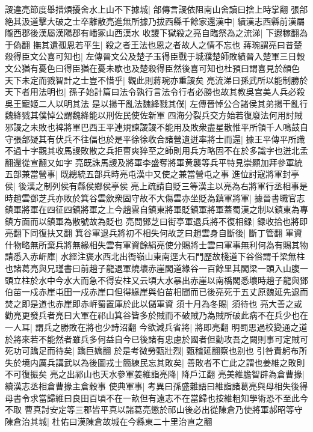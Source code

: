 謖違亮節度舉措煩擾舍水上山不下據城|{
	郃傳言謖依阻南山舍讀曰捨上時掌翻}
張郃絶其汲道擊大破之士卒離散亮進無所據乃拔西縣千餘家還漢中|{
	續漢志西縣前漢屬隴西郡後漢屬漢陽郡有嶓冢山西漢水}
收謖下獄殺之亮自臨祭為之流涕|{
	下遐稼翻為于偽翻}
撫其遺孤恩若平生|{
	殺之者王法也恩之者故人之情不忘也}
蔣琬謂亮曰昔楚殺得臣文公喜可知也|{
	左傳晉文公及楚子玉得臣戰于城濮楚師敗績晉入楚軍三日穀文公猶有憂色曰得臣猶在憂未歇也及楚殺得臣然後喜可知也杜預曰謂喜見於顔色}
天下未定而戮智計之士豈不惜乎|{
	觀此則蔣琬亦重謖矣}
亮流涕曰孫武所以能制勝於天下者用法明也|{
	孫子始計篇曰法令孰行言法令行者必勝也故其教吳宫美人兵必殺吳王寵姬二人以明其法}
是以揚干亂法魏絳戮其僕|{
	左傳晉悼公合諸侯其弟揚干亂行魏絳戮其僕悼公謂魏絳能以刑佐民使佐新軍}
四海分裂兵交方始若復廢法何用討賊邪謖之未敗也裨將軍巴西王平連規諫謖謖不能用及敗衆盡星散惟平所領千人鳴鼓自守張郃疑其有伏兵不往偪也於是平徐徐收合諸營遺迸率將士而還|{
	據王平傳平所識不過十字觀其收馬謖敗散之兵拒曹爽猝至之師則用兵方略固不在於多識字也迸北孟翻還從宣翻又如字}
亮既誅馬謖及將軍李盛奪將軍黄襲等兵平特見崇顯加拜參軍統五部兼當營事|{
	既總統五部兵時亮屯漢中又使之兼當營屯之事}
進位討寇將軍封亭侯|{
	後漢之制列侯有縣侯鄉侯亭侯}
亮上疏請自貶三等漢主以亮為右將軍行丞相事是時趙雲鄧芝兵亦敗於箕谷雲歛衆固守故不大傷雲亦坐貶為鎮軍將軍|{
	據晉書職官志鎮軍將軍在四征四鎮將軍之上今趙雲自鎮東將軍貶鎮軍將軍蓋蜀漢之制以鎮東為專鎮方面而以鎮軍為散號故為貶也}
亮問鄧芝曰街亭軍退兵將不復相録|{
	録收拾也將即亮翻下同復扶又翻}
箕谷軍退兵將初不相失何故芝曰趙雲身自斷後|{
	斷丁管翻}
軍資什物略無所棄兵將無緣相失雲有軍資餘絹亮使分賜將士雲曰軍事無利何為有賜其物請悉入赤㟁庫|{
	水經注褒水西北出衙嶺山東南逕大石門歷故棧道下谷俗謂千梁無柱也諸葛亮與兄瑾書曰前趙子龍退軍燒壞赤崖閣道緣谷一百餘里其閣梁一頭入山腹一頭立柱於水中今水大而急不得安柱又云頃大水暴出赤崖以南橋閣悉壞時趙子龍與鄧伯苗一戍赤崖屯田一戍赤崖口但得緣崖與伯苗相聞而已後亮死于五丈原魏延先退而焚之即是道也赤崖即赤㟁蜀置庫於此以儲軍資}
須十月為冬賜|{
	須待也}
亮大善之或勸亮更發兵者亮曰大軍在祁山箕谷皆多於賊而不破賊乃為賊所破此病不在兵少也在一人耳|{
	謂兵之勝敗在將也少詩沼翻}
今欲減兵省將|{
	將即亮翻}
明罰思過校變通之道於將來若不能然者雖兵多何益自今已後諸有忠慮於國者但勤攻吾之闕則事可定賊可死功可蹻足而待矣|{
	蹻巨嬌翻}
於是考微勞甄壯烈|{
	甄稽延翻察也别也}
引咎責躬布所失於境内厲兵講武以為後圖戎士簡練民忘其敗矣|{
	善敗者不亡此之謂也姜維之敗則不可復振矣}
亮之出祁山也天水參軍姜維詣亮降|{
	降戶江翻}
亮美維膽智辟為倉曹掾|{
	續漢志丞相倉曹掾主倉穀事}
使典軍事|{
	考異曰孫盛雜語曰維詣諸葛亮與母相失後得母書令求當歸維曰良田百頃不在一畝但有遠志不在當歸也按維粗知學術恐不至此今不取}
曹真討安定等三郡皆平真以諸葛亮懲於祁山後必出從陳倉乃使將軍郝昭等守陳倉治其城|{
	杜佑曰漢陳倉故城在今縣東二十里治直之翻}
